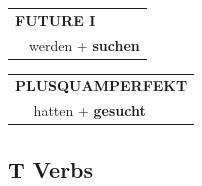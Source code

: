 \documentclass[10pt,a4paper]{revtex4-2}
\begin{document}
\begin{verbbox-acc}
\begin{tabular}{rl}
    \multicolumn{2}{l}{\textbf{FUTURE I} }\\
   & werden + \textbf{suchen}\\
 
  \end{tabular}
\hfill
   \begin{tabular}{rl}
      \multicolumn{2}{l}{\textbf{PLUSQUAMPERFEKT}}\\
   & hatten + \textbf{gesucht}\\
  \end{tabular}
  
  \vspace{-5pt}


\end{verbbox-acc}

\subsection{T Verbs}
\end{document}
